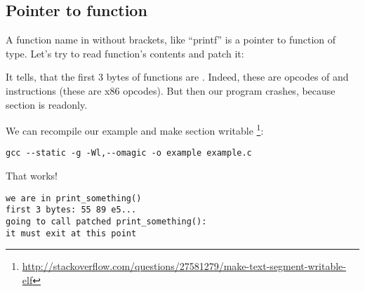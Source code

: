 \subsection{Pointer to function}

A function name in \CCpp without brackets, like ``printf'' is a pointer to function of  type.
Let's try to read function's contents and patch it:



It tells, that the first 3 bytes of functions are .
Indeed, these are opcodes of  and  instructions (these are x86 opcodes).
But then our program crashes, because  section is readonly.

We can recompile our example and make  section writable
\footnote{\url{http://stackoverflow.com/questions/27581279/make-text-segment-writable-elf}}:

\begin{lstlisting}
gcc --static -g -Wl,--omagic -o example example.c
\end{lstlisting}

That works!

\begin{lstlisting}
we are in print_something()
first 3 bytes: 55 89 e5...
going to call patched print_something():
it must exit at this point
\end{lstlisting}

